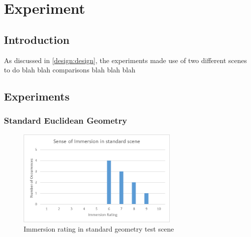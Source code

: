 \chapter{Experiment}
\label{exp}

	\section{Introduction}
	\label{exp:intro}

		As discussed in \autoref{design:design}, the experiments made use of two different scenes to do blah blah comparisons blah blah blah



	\section{Experiments}
	\label{exp:exp}

		\subsection{Standard Euclidean Geometry}
		\label{exp:exp:standard}


			\begin{figure}[H]
				\includegraphics[width=0.7\textwidth]{Images/Standard_Immersion}
				\centering
				\caption{Immersion rating in standard geometry test scene}
				\label{exp:fig:standard_immersion}
			\end{figure}

